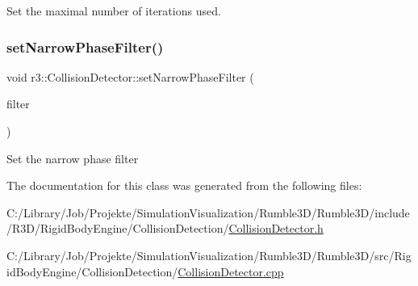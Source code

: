 Set the maximal number of iterations used. \mbox{\label{classr3_1_1_collision_detector_a98f6ab749622d7fcffbdc0dcf59cfa75}} 
\subsubsection{\texorpdfstring{set\+Narrow\+Phase\+Filter()}{setNarrowPhaseFilter()}}
{\footnotesize\ttfamily void r3\+::\+Collision\+Detector\+::set\+Narrow\+Phase\+Filter (\begin{DoxyParamCaption}\item[{\mbox{\hyperlink{classr3_1_1_collision_detector_a094cc287cba14d5a063cfca41e667008}{Narrow\+Phase\+Filter\+\_\+\+Ptr}}}]{filter }\end{DoxyParamCaption})}

Set the narrow phase filter 

The documentation for this class was generated from the following files\+:\begin{DoxyCompactItemize}
\item 
C\+:/\+Library/\+Job/\+Projekte/\+Simulation\+Visualization/\+Rumble3\+D/\+Rumble3\+D/include/\+R3\+D/\+Rigid\+Body\+Engine/\+Collision\+Detection/\mbox{\hyperlink{_collision_detector_8h}{Collision\+Detector.\+h}}\item 
C\+:/\+Library/\+Job/\+Projekte/\+Simulation\+Visualization/\+Rumble3\+D/\+Rumble3\+D/src/\+Rigid\+Body\+Engine/\+Collision\+Detection/\mbox{\hyperlink{_collision_detector_8cpp}{Collision\+Detector.\+cpp}}\end{DoxyCompactItemize}
